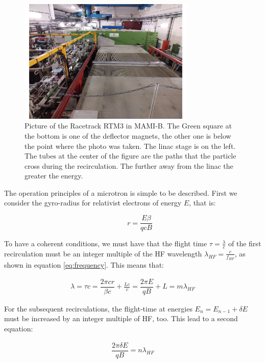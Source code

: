 \begin{figure}[hbtp]
\centering
\includegraphics[width=0.75\textwidth]{ExperimentalSetup/Racetrack.pdf}
\caption{Picture of the Racetrack RTM3 in MAMI-B. The Green square at the bottom is one of the deflector magnets, the other one is below the point where the photo was taken. The linac stage is on the left. The tubes at the center of the figure are the paths that the particle cross during the recirculation. The further away from the linac the greater the energy.}
\end{figure}

The operation principles of a microtron is simple to be described. First we consider the gyro-radius for relativist electrons of energy $E$, that is:

\begin{equation}
\qquad r = \dfrac{E \beta}{qcB}
\end{equation}

To have a coherent conditions, we must have that the flight time $\tau = \frac{\lambda}{c}$ of the first recirculation must be an integer multiple of the HF wavelength $\lambda_{HF} = \frac{c}{f_{HF}}$, as shown in equation \ref{eq:frequency}. This means that:

\begin{align*}
\lambda = \tau c =\dfrac{ 2 \pi c r }{\beta c} + \frac{Lc}{v} = \dfrac{2 \pi E}{q B} + L = m \lambda_{HF}
\end{align*}

For the subsequent recirculations, the flight-time at energies $E_{n} = E_{n-1} + \delta E$ must be increased by an integer multiple of HF, too. This lead to a second equation:

\begin{align*}
\dfrac{2 \pi \delta E}{q B} = n \lambda_{HF}
\end{align*}

